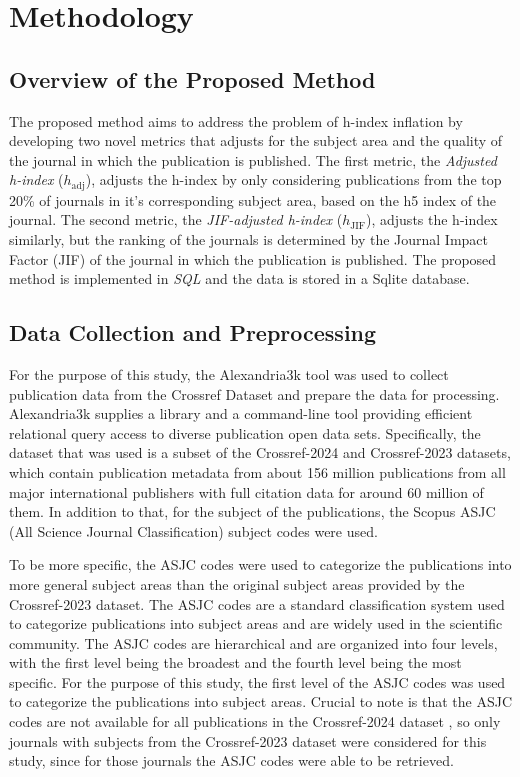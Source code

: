 \chapter{Methodology}
\label{ch:methods}

\section{Overview of the Proposed Method}

The proposed method aims to address the problem of h-index inflation by
developing two novel metrics that adjusts for the subject area and the quality
of the journal in which the publication is published. The first metric, the
\textit{Adjusted h-index} ($h_{\text{adj}}$), adjusts the h-index by only
considering publications from the top 20\% of journals in it's corresponding
subject area, based on the h5 index of the journal. The second metric, the
\textit{JIF-adjusted h-index} ($h_{\text{JIF}}$), adjusts the h-index
similarly, but the ranking of the journals is determined by the Journal Impact
Factor (JIF) of the journal in which the publication is published. The proposed
method is implemented in \emph{SQL} and the data is stored in a Sqlite
database.

\section{Data Collection and Preprocessing}

For the purpose of this study, the Alexandria3k \cite{Spi23g} tool was used to
collect publication data from the Crossref Dataset \cite{Crossref2020} and
prepare the data for processing. Alexandria3k supplies a library and a
command-line tool providing efficient relational query access to diverse
publication open data sets. Specifically, the dataset that was used is a subset
of the Crossref-2024 and Crossref-2023 datasets, which contain publication
metadata from about 156 million publications from all major international
publishers with full citation data for around 60 million of them. In addition
to that, for the subject of the publications, the Scopus ASJC (All Science
Journal Classification) subject codes were used.

To be more specific, the ASJC codes were used to categorize the publications
into more general subject areas than the original subject areas provided by the
Crossref-2023 dataset. The ASJC codes are a standard classification system used
to categorize publications into subject areas and are widely used in the
scientific community. The ASJC codes are hierarchical and are organized into
four levels, with the first level being the broadest and the fourth level being
the most specific. For the purpose of this study, the first level of the ASJC
codes was used to categorize the publications into subject areas. Crucial to
note is that the ASJC codes are not available for all publications in the
Crossref-2024 dataset \cite{crossrefSubjectCodes2024}, so only journals with
subjects from the Crossref-2023 dataset were considered for this study, since
for those journals the ASJC codes were able to be retrieved.

